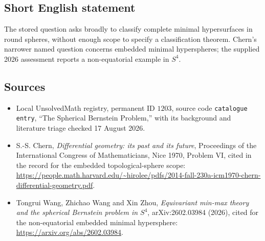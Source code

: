 \documentclass[11pt]{article}
\begin{document}
\subsection{Short English statement}
The stored question asks broadly to classify complete minimal hypersurfaces in round spheres, without enough scope to specify a classification theorem. Chern's narrower named question concerns embedded minimal hyperspheres; the supplied 2026 assessment reports a non-equatorial example in $S^4$.
\subsection{Sources}
\begin{itemize}
\item Local UnsolvedMath registry, permanent ID $1203$, source code \texttt{catalogue entry}, ``The Spherical Bernstein Problem,'' with its background and literature triage checked 17 August 2026.
\item S.-S. Chern, \emph{Differential geometry: its past and its future}, Proceedings of the International Congress of Mathematicians, Nice 1970, Problem VI, cited in the record for the embedded topological-sphere scope: \url{https://people.math.harvard.edu/~hirolee/pdfs/2014-fall-230a-icm1970-chern-differential-geometry.pdf}.
\item Tongrui Wang, Zhichao Wang and Xin Zhou, \emph{Equivariant min-max theory and the spherical Bernstein problem in $S^4$}, arXiv:2602.03984 (2026), cited for the non-equatorial embedded minimal hypersphere: \url{https://arxiv.org/abs/2602.03984}.
\end{itemize}
\end{document}
